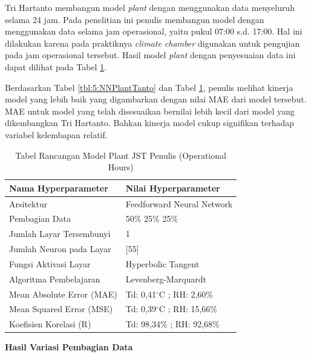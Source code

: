 Tri Hartanto membangun model \textit{plant} dengan menggunakan data menyeluruh selama 24 jam. Pada penelitian ini penulis membangun model dengan menggunakan data selama jam operasional, yaitu pukul 07:00 s.d. 17:00. Hal ini dilakukan karena pada praktiknya \textit{climate chamber} digunakan untuk pengujian pada jam operasional tersebut. Hasil model \textit{plant} dengan penyesuaian data ini dapat dilihat pada Tabel \ref{tbl:5:NNPlantTanto2}.

Berdasarkan Tabel \ref{tbl:5:NNPlantTanto} dan Tabel \ref{tbl:5:NNPlantTanto2}, penulis melihat kinerja model yang lebih baik yang digambarkan dengan nilai MAE dari model tersebut. MAE untuk model yang telah disesuaikan bernilai lebih kecil dari model yang dikembangkan Tri Hartanto. Bahkan kinerja model cukup signifikan terhadap variabel kelembapan relatif.\\

\begin{table}[!t]
	\caption{Tabel Rancangan Model Plant JST Penulis (Operational Hours)}
	\label{tbl:5:NNPlantTanto2}
	\centering
	\begin{tabular}{|p{5.7cm}|p{5cm}|}
		\hline
		\textbf{Nama Hyperparameter} & \textbf{Nilai Hyperparameter} \\ \hline
		Arsitektur & Feedforward Neural Network \\ \hline
		Pembagian Data & 50\% 25\% 25\% \\ \hline 
		Jumlah Layar Tersembunyi & 1 \\ \hline
		Jumlah Neuron pada Layar & [55] \\ \hline
		Fungsi Aktivasi Layar & Hyperbolic Tangent \\ \hline
		Algoritma Pembelajaran & Levenberg-Marquardt \\ \hline
		Mean Absolute Error (MAE) & Td: 0,41$^\circ$C ; RH: 2,60\% \\ \hline
		Mean Squared Error (MSE) & Td: 0,39$^\circ$C ; RH: 15,66\% \\ \hline
		Koefisien Korelasi (R) & Td: 98,34\% ; RH: 92,68\% \\ \hline
	\end{tabular}
\end{table}

\noindent \textbf{Hasil Variasi Pembagian Data} 

